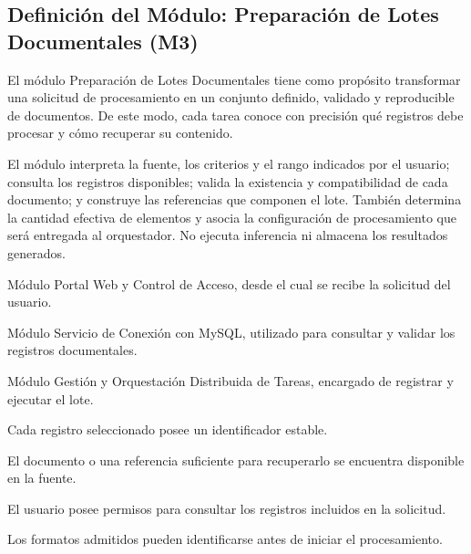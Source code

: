 
\subsection{Definición del Módulo: Preparación de Lotes Documentales (M3)}
\label{subsec:modulo_m3}

\begin{definicionmodulo}

\item[Propósito] El módulo Preparación de Lotes Documentales tiene como propósito transformar una solicitud de procesamiento en un conjunto definido, validado y reproducible de documentos. De este modo, cada tarea conoce con precisión qué registros debe procesar y cómo recuperar su contenido.

\item[Alcance] El módulo interpreta la fuente, los criterios y el rango indicados por el usuario; consulta los registros disponibles; valida la existencia y compatibilidad de cada documento; y construye las referencias que componen el lote. También determina la cantidad efectiva de elementos y asocia la configuración de procesamiento que será entregada al orquestador. No ejecuta inferencia ni almacena los resultados generados.

\item[Dependencias]
\begin{elementosmodulo}
    \item Módulo Portal Web y Control de Acceso, desde el cual se recibe la solicitud del usuario.
    \item Módulo Servicio de Conexión con MySQL, utilizado para consultar y validar los registros documentales.
    \item Módulo Gestión y Orquestación Distribuida de Tareas, encargado de registrar y ejecutar el lote.
\end{elementosmodulo}

\item[Supuestos]
\begin{elementosmodulo}
    \item Cada registro seleccionado posee un identificador estable.
    \item El documento o una referencia suficiente para recuperarlo se encuentra disponible en la fuente.
    \item El usuario posee permisos para consultar los registros incluidos en la solicitud.
    \item Los formatos admitidos pueden identificarse antes de iniciar el procesamiento.
\end{elementosmodulo}


\end{definicionmodulo}

